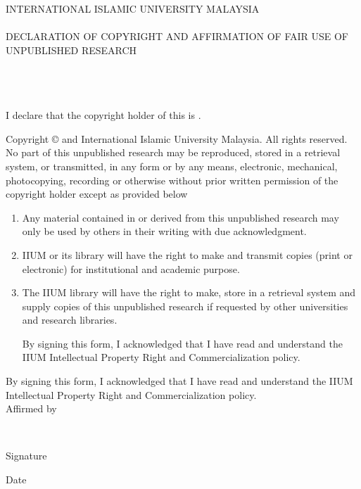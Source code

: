 \documentclass[12pt, a4paper]{memoir}
\begin{document}
\thispagestyle{empty}

\begin{center}
\begin{Large}
\MakeUppercase{International Islamic University Malaysia}\\~\\
\MakeUppercase{Declaration of Copyright and Affirmation of Fair Use of 
Unpublished Research}\\~\\
\MakeUppercase{\myTitle}\\~\\
\end{Large}
\noindent I declare that the copyright holder of this \myDocument is 
\myName.\\
\end{center}

\noindent Copyright \copyright{} \myYear \myName and International Islamic 
University 
Malaysia. All rights reserved.\\

\noindent No part of this unpublished research may be reproduced, stored in a 
retrieval
system, or transmitted, in any form or by any means, electronic, mechanical,
photocopying, recording or otherwise without prior written permission of the
copyright holder except as provided below

\begin{enumerate}
\item Any material contained in or derived from this unpublished research
may only be used by others in their writing with due acknowledgment.

\item IIUM or its library will have the right to make and transmit copies
(print or electronic) for institutional and academic purpose.

\item The IIUM library will have the right to make, store in a retrieval system
and supply copies of this unpublished research if requested by other
universities and research libraries.

By signing this form, I acknowledged that I have read and understand the
IIUM Intellectual Property Right and Commercialization policy.
\end{enumerate}

\noindent By signing this form, I acknowledged that I have read and understand 
the
IIUM Intellectual Property Right and Commercialization policy.\\[48pt]

\noindent Affirmed by \myName\\

\vfill

\noindent \makebox[2in]{\dotfill} \hfill \makebox[2in]{\dotfill}\\
\parbox{2in}{\centering Signature} \hfill \parbox{2in}{\centering Date}
\end{document}
